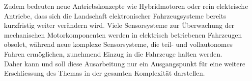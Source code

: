     Zudem bedeuten neue Antriebskonzepte wie Hybridmotoren oder rein elektrische Antriebe, dass sich die Landschaft elektronischer Fahrzeugsysteme bereits kurzfristig 
    weiter verändern wird. Viele Sensorsysteme zur Überwachung der mechanischen Motorkomponenten werden in elektrisch betriebenen Fahrzeugen obsolet, während
    neue komplexe Sensorsysteme, die teil- und vollautonomes Fahren ermöglichen, zunehmend Einzug in die Fahrzeuge halten werden.\\

    Daher kann und soll diese Ausarbeitung nur ein Ausgangspunkt für eine weitere Erschliessung des Themas in der gesamten Komplexität darstellen.
